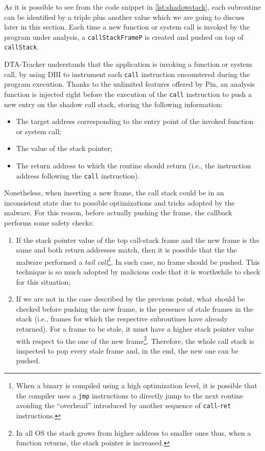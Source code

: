 \documentclass[LaM,binding=0.6cm]{sapthesis}
\begin{document}
\noindent
As it is possible to see from the code snippet in \autoref{lst:shadowstack}, each subroutine can be identified by a triple plus another value which we are going to discuss later in this section. Each time a new function or system call is invoked by the program under analysis, a \texttt{callStackFrameP} is created and pushed on top of \texttt{callStack}.

{\sf DTA-Tracker} understands that the application is invoking a function or system call, by using DBI to instrument each \texttt{call} instruction encountered during the program execution. Thanks to the unlimited features offered by Pin, an analysis function is injected right before the execution of the \texttt{call} instruction to push a new entry on the shadow call stack, storing the following information:
\begin{itemize}
\item The target address corresponding to the entry point of the invoked function or system call;
\item The value of the stack pointer;
\item The return address to which the routine should return (i.e., the instruction address following the \texttt{call} instruction).
\end{itemize} 
Nonetheless, when inserting a new frame, the call stack could be in an inconsistent state due to possible optimizations and tricks adopted by the malware. For this reason, before actually pushing the frame, the callback performs some safety checks:
\begin{enumerate}
\item If the stack pointer value of the top call-stack frame and the new frame is the same and both return addresses match, then it is possible that the the malware performed a \textit{tail call}\footnote{When a binary is compiled using a high optimization level, it is possible that the compiler uses a \texttt{jmp} instructions to directly jump to the next routine avoiding the ``overhead'' introduced by another sequence of \texttt{call}-\texttt{ret} instructions.}. In such case, no frame should be pushed. This technique is so much adopted by malicious code that it is worthwhile to check for this situation;
\item If we are not in the case described by the previous point, what should be checked before pushing the new frame, is the presence of stale frames in the stack (i.e., frames for which the respective subroutines have already returned). For a frame to be stale, it must have a higher stack pointer value with respect to the one of the new frame\footnote{In all OS the stack grows from higher address to smaller ones thus, when a function returns, the stack pointer is increased.}. Therefore, the whole call stack is inspected to pop every stale frame and, in the end, the new one can be pushed.  
\end{enumerate}
\end{document}
